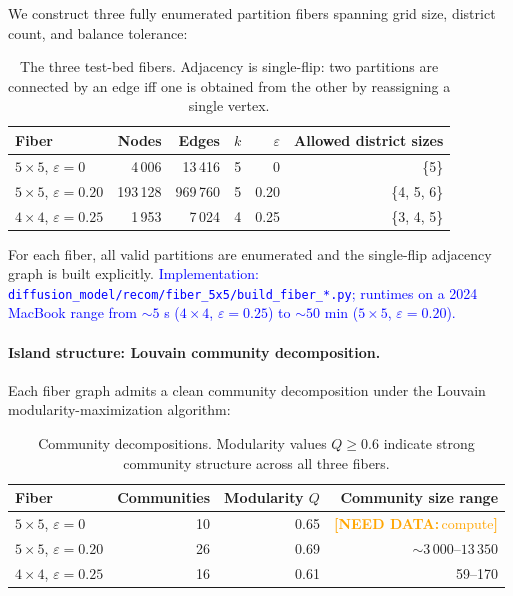 \documentclass[11pt]{article}
\newcommand{\needdata}[1]{\textcolor{orange}{\textbf{[NEED DATA:}\,#1\textbf{]}}}
\newcommand{\draft}[1]{\textcolor{blue}{#1}}
\begin{document}
We construct three fully enumerated partition fibers spanning grid
size, district count, and balance tolerance:

\begin{table}[H]
\centering
\small
\begin{tabular}{lrrrrr}
\toprule
Fiber & Nodes & Edges & $k$ & $\varepsilon$ & Allowed district sizes \\
\midrule
$5 \times 5$, $\varepsilon = 0$    & 4\,006   & 13\,416  & 5 & 0    & \{5\} \\
$5 \times 5$, $\varepsilon = 0.20$ & 193\,128 & 969\,760 & 5 & 0.20 & \{4, 5, 6\} \\
$4 \times 4$, $\varepsilon = 0.25$ & 1\,953   & 7\,024   & 4 & 0.25 & \{3, 4, 5\} \\
\bottomrule
\end{tabular}
\caption{The three test-bed fibers. Adjacency is single-flip: two
  partitions are connected by an edge iff one is obtained from the
  other by reassigning a single vertex.}\label{tab:fibers}
\end{table}

For each fiber, all valid partitions are enumerated and the single-flip
adjacency graph is built explicitly. \draft{Implementation:
\texttt{diffusion\_model/recom/fiber\_5x5/build\_fiber\_*.py};
runtimes on a 2024 MacBook range from $\sim 5$ s ($4 \times 4$,
$\varepsilon = 0.25$) to $\sim 50$ min ($5 \times 5$, $\varepsilon = 0.20$).}

\paragraph{Island structure: Louvain community decomposition.}\label{sec:fiber-islands}

Each fiber graph admits a clean community decomposition under the
Louvain modularity-maximization algorithm:

\begin{table}[H]
\centering
\small
\begin{tabular}{lrrr}
\toprule
Fiber & Communities & Modularity $Q$ & Community size range \\
\midrule
$5 \times 5$, $\varepsilon = 0$    & 10 & 0.65 & \needdata{compute} \\
$5 \times 5$, $\varepsilon = 0.20$ & 26 & 0.69 & $\sim 3\,000$--$13\,350$ \\
$4 \times 4$, $\varepsilon = 0.25$ & 16 & 0.61 & 59--170 \\
\bottomrule
\end{tabular}
\caption{Community decompositions. Modularity values $Q \ge 0.6$
  indicate strong community structure across all three fibers.}
\label{tab:communities}
\end{table}
\end{document}
